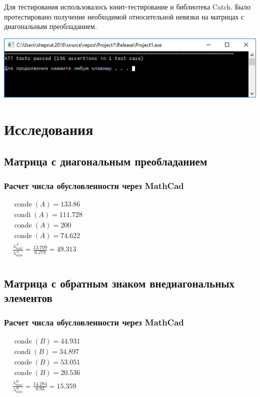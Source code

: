 Для тестирования использовалось юнит-тестирование и библиотека Catch. Было протестировано получение необходимой относительной невязки на матрицах с диагональным преобладанием.

\begin{center}
\noindent\includegraphics[scale=0.7]{unit_test.png}
\end{center}

\section{Исследования}

\subsection{Матрица с диагональным преобладанием}


\subsubsection{Расчет числа обусловленности через MathCad}
$\displaystyle
	\begin{aligned}
		&\mathop{conde}(A) = 133.86 \\
		&\mathop{condi}(A) = 111.728 \\
		&\mathop{conde}(A) = 200  \\
		&\mathop{conde}(A) = 74.622  \\
		&\frac{\lambda^A_{max}}{\lambda^A_{min}} = \frac{13.709}{0.278} = 49.313  \\
	\end{aligned}
$

\subsection{Матрица с обратным знаком внедиагональных элементов}


\subsubsection{Расчет числа обусловленности через MathCad}
$\displaystyle
	\begin{aligned}
		&\mathop{conde}(B) = 44.931 \\
		&\mathop{condi}(B) = 34.897 \\
		&\mathop{conde}(B) = 53.051  \\
		&\mathop{conde}(B) = 20.536  \\
		&\frac{\lambda^B_{max}}{\lambda^B_{min}} = \frac{14.284}{0.93} = 15.359  \\
	\end{aligned}
$

